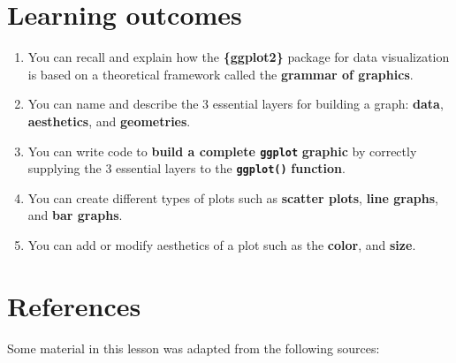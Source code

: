 \documentclass[
  letterpaper,
  DIV=11,
  numbers=noendperiod]{scrreprt}
\begin{document}
\section{Learning outcomes}\label{learning-outcomes}

\begin{enumerate}
\def\labelenumi{\arabic{enumi}.}
\item
  You can recall and explain how the \textbf{\{ggplot2\}} package for
  data visualization is based on a theoretical framework called the
  \textbf{grammar of graphics}.
\item
  You can name and describe the 3 essential layers for building a graph:
  \textbf{data}, \textbf{aesthetics}, and \textbf{geometries}.
\item
  You can write code to \textbf{build a complete \texttt{ggplot}}
  \textbf{graphic} by correctly supplying the 3 essential layers to the
  \textbf{\texttt{ggplot()}} \textbf{function}.
\item
  You can create different types of plots such as \textbf{scatter
  plots}, \textbf{line graphs}, and \textbf{bar graphs}.
\item
  You can add or modify aesthetics of a plot such as the \textbf{color},
  and \textbf{size}.
\end{enumerate}

\section*{References}\label{references-12}


Some material in this lesson was adapted from the following sources:
\end{document}
